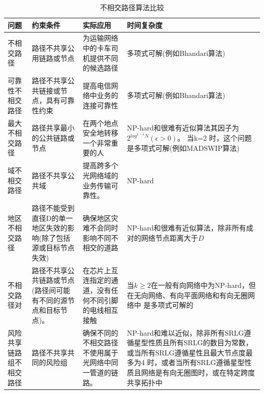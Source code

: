 \begin{table}[htb]
\caption{不相交路径算法比较}\label{tab:disjointPath}
\vspace{0.5em}\centering\wuhao
\begin{tabularx}{46em}{|*{4}{>{\centering\arraybackslash}X|}}
\toprule[1.5pt]
问题   & 约束条件   & 实际应用 & 时间复杂度  \\
\midrule[1pt]
不相交路径 & 路径不共享公用链路或节点 & 为运输网络中的卡车司机提供不同的候选路径 & 多项式可解(例如Bhandari算法\cite{bhandari1997optimal})\\
\hline
可靠性不相交路径 & 路径不共享公共链接或节点，具有可靠性约束 & 提高电信网络中业务的连接可靠性 & 多项式可解(例如Bhandari算法\cite{bhandari1997optimal})\\
\hline
最大不相交路径 & 路径共享最小的公共链路或节点 & 在两个地点安全地转移一个非常重要的人 & NP-hard和很难有近似算法其因子为$2^{log^{1-\epsilon}N}(\epsilon>0)$。 当k=2 时，这个问题是多项式可解(例如MADSWIP算法\cite{taft1999quality})\\
\hline
域不相交路径 & 路径不共享公共域 & 提高跨多个光网络域的业务传输可靠性。 & NP-hard\cite{gao2013domain}\\
\hline
地区不相交路径 & 路径不能受到直径D的单一地区失效的影响(除了包括源或目标节点失效) & 确保地区灾难不会同时影响不同不相交的道路 & NP-hard和很难有近似算法\cite{trajanovski2015finding}，除非所有成对的网络节点距离大于$D$\\
\hline
不相交路径对 & 路径不共享公共链路或节点(路径间可能有不同的源节点和目标节点)。 & 在芯片上互连指定的通道，没有任何不同引脚的电线相互接触 & 当$k\geq2$在一般有向网络中为NP-hard\cite{fortune1980directed}，但在无向网络\cite{robertson1995graph}、有向平面网络\cite{schrijver1994finding}和有向无圈网络中\cite{fortune1980directed} 是多项式可解的 \\
\hline
风险共享链路组不相交路径 & 路径不共享共同的风险组 & 确保不同的不相交路径不使用属于光网络中同一管道的链路。 & NP-hard\cite{hu2003diverse}和难以近似\cite{coudert2007shared}，除非所有SRLG遵循星型性质且所有SRLG的数目为常数\cite{bermond2013srlg}，或当所有SRLG遵循星性且最大节点度最多为4\cite{bermond2013srlg} 时，或者当所有SRLG遵循星型性质且网络是有向无圈图\cite{bermond2013srlg}时，或在特定跨度共享拓扑\cite{bhandari1994optimal}中\\
\bottomrule[1.5pt]
\end{tabularx}
\vspace{\baselineskip}
\end{table}
